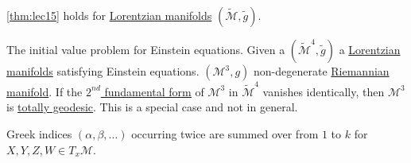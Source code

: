 \begin{note}
	\autoref{thm:lec15} holds for \hyperref[def:Lorentzian]{Lorentzian manifolds} \((\widetilde{\mathcal{M}} , \widetilde{g} )\).
\end{note}

\begin{eg}
	The initial value problem for Einstein equations. Given a \((\widetilde{\mathcal{M}} ^4, \widetilde{g} )\) a \hyperref[def:Lorentzian]{Lorentzian manifolds} satisfying Einstein equations. \((\mathcal{M} ^3, g)\) non-degenerate \hyperref[def:Riemannian-manifold]{Riemannian manifold}. If the \hyperref[def:2nd-fundamental-form]{\(2^{nd} \) fundamental form} of \(\mathcal{M} ^3\) in \(\widetilde{\mathcal{M}} ^4\) vanishes identically, then \(\mathcal{M} ^3\) is \hyperref[def:totally-geodesic]{totally geodesic}. This is a special case and not in general.
\end{eg}

\begin{notation}
	Greek indices \((\alpha , \beta , \dots )\) occurring twice are summed over from \(1\) to \(k\) for \(X, Y, Z, W \in T_x \mathcal{M} \).
\end{notation}

